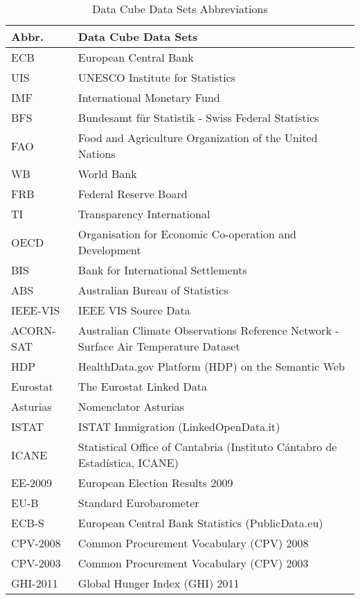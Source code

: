 \documentclass{llncs}
\begin{document}
\begin{table}[H]
	\centering
		\begin{tabular}{l|l}
      \textbf{Abbr.} & \textbf{Data Cube Data Sets} \\		
      \hline
    ECB & European Central Bank\tablefootnote{\url{http://www.ecb.europa.eu/home/html/index.en.html}} \\
		UIS & UNESCO Institute for Statistics\tablefootnote{\url{http://www.uis.unesco.org/Pages/default.aspx}} \\
		IMF & International Monetary Fund\tablefootnote{\url{http://www.imf.org/external/index.htm}} \\
		BFS & Bundesamt für Statistik - Swiss Federal Statistics\tablefootnote{\url{http://www.bfs.admin.ch/}} \\
		FAO & Food and Agriculture Organization of the United Nations\tablefootnote{\url{http://www.fao.org/home/en/}} \\
		WB & World Bank\tablefootnote{\url{http://www.worldbank.org/}} \\
		FRB & Federal Reserve Board\tablefootnote{\url{http://www.federalreserve.gov/}} \\
		TI & Transparency International\tablefootnote{\url{http://www.transparency.org/}} \\
		OECD & Organisation for Economic Co-operation and Development\tablefootnote{\url{http://www.oecd.org/}} \\
		BIS & Bank for International Settlements\tablefootnote{\url{http://www.bis.org/}} \\
		ABS & Australian Bureau of Statistics\tablefootnote{\url{http://abs.gov.au/}} \\
		IEEE-VIS & IEEE VIS Source Data \\
		ACORN-SAT & Australian Climate Observations Reference Network - Surface Air Temperature Dataset \\
		HDP & HealthData.gov Platform (HDP) on the Semantic Web \\
		Eurostat & The Eurostat Linked Data  \\
		Asturias & Nomenclator Asturias \\
		ISTAT & ISTAT Immigration (LinkedOpenData.it) \\
		ICANE & Statistical Office of Cantabria (Instituto Cántabro de Estadística, ICANE) \\
		EE-2009 & European Election Results 2009 \\
		EU-B & Standard Eurobarometer \\
		ECB-S & European Central Bank Statistics (PublicData.eu) \\
		CPV-2008 & Common Procurement Vocabulary (CPV) 2008 \\
		CPV-2003 & Common Procurement Vocabulary (CPV) 2003 \\
		GHI-2011 & Global Hunger Index (GHI) 2011 \\
		\end{tabular}
	\caption{Data Cube Data Sets Abbreviations}
	\label{tab:data-cube-data-sets-abbreviations}
\end{table}
\end{document}
